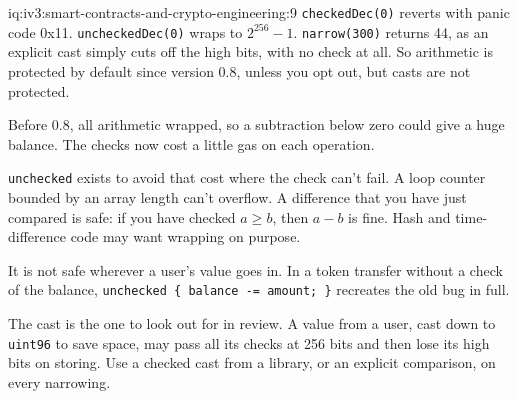 \begin{solution}{iq:iv3:smart-contracts-and-crypto-engineering:9}
\texttt{checkedDec(0)} reverts with panic code 0x11. \texttt{uncheckedDec(0)} wraps to $2^{256} - 1$. \texttt{narrow(300)} returns 44, as an explicit cast simply cuts off the high bits, with no check at all. So arithmetic is protected by default since version 0.8, unless you opt out, but casts are not protected.

Before 0.8, all arithmetic wrapped, so a subtraction below zero could give a huge balance. The checks now cost a little gas on each operation.

\texttt{unchecked} exists to avoid that cost where the check can't fail. A loop counter bounded by an array length can't overflow. A difference that you have just compared is safe: if you have checked $a \ge b$, then $a - b$ is fine. Hash and time-difference code may want wrapping on purpose.

It is not safe wherever a user's value goes in. In a token transfer without a check of the balance, \texttt{unchecked \{ balance -= amount; \}} recreates the old bug in full.

The cast is the one to look out for in review. A value from a user, cast down to \texttt{uint96} to save space, may pass all its checks at 256 bits and then lose its high bits on storing. Use a checked cast from a library, or an explicit comparison, on every narrowing.

\end{solution}

